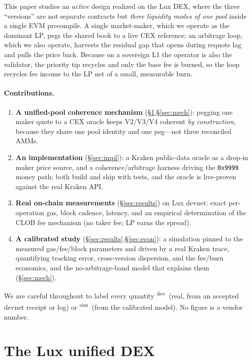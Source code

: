 \documentclass[11pt,a4paper]{article}
\newcommand{\dev}{\textsuperscript{\textsf{\scriptsize dev}}}
\newcommand{\sither}{\textsuperscript{\textsf{\scriptsize sim}}}
\begin{document}
This paper studies an \emph{active} design realized on the Lux DEX, where the three
``versions'' are not separate contracts but \emph{three liquidity modes of one pool}
inside a single EVM precompile. A single market-maker, which we operate as the dominant
LP, pegs the shared book to a live CEX reference; an arbitrage loop, which we also
operate, harvests the residual gap that opens during requote lag and pulls the price
back. Because on a sovereign L1 the operator is also the validator, the priority tip
recycles and only the base fee is burned, so the loop recycles fee income to the LP net
of a small, measurable burn.

\paragraph{Contributions.}
\begin{enumerate}[leftmargin=1.4em]
\item \textbf{A unified-pool coherence mechanism} (\S\ref{sec:dex},\S\ref{sec:mech}):
  pegging one maker quote to a CEX oracle keeps V2/V3/V4 coherent \emph{by
  construction}, because they share one pool identity and one peg---not three
  reconciled AMMs.
\item \textbf{An implementation} (\S\ref{sec:impl}): a Kraken public-data oracle as a
  drop-in maker price source, and a coherence/arbitrage harness driving the
  \texttt{0x9999} money path; both build and ship with tests, and the oracle is
  live-proven against the real Kraken API.
\item \textbf{Real on-chain measurements} (\S\ref{sec:results}) on Lux devnet: exact
  per-operation gas, block cadence, latency, and an empirical determination of the
  CLOB fee mechanism (no taker fee; LP earns the spread).
\item \textbf{A calibrated study} (\S\ref{sec:results},\S\ref{sec:econ}): a simulation
  pinned to the measured gas/fee/block parameters and driven by a real Kraken trace,
  quantifying tracking error, cross-version dispersion, and the fee/burn economics, and
  the no-arbitrage-band model that explains them (\S\ref{sec:mech}).
\end{enumerate}

We are careful throughout to label every quantity \dev~(real, from an accepted devnet
receipt or log) or \sither~(from the calibrated model). No figure is a vendor number.

\section{The Lux unified DEX}\label{sec:dex}
\end{document}
